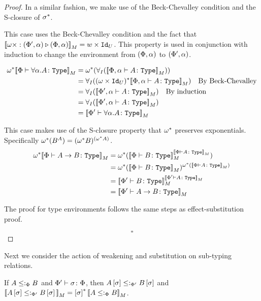 \documentclass{Report}
\begin{document}
\begin{proof}
   In a similar fashion, we make use of the Beck-Chevalley condition and the S-closure of $\sigma^*$.

        This case uses the Beck-Chevalley condition and the fact that ${\bf [\![}\omega\times : (\Phi', \alpha) \triangleright (\Phi,\alpha){\bf ]\!]}_M = w\times \texttt{Id}_{U}$. This property is used in conjunction with induction to change the environment from $(\Phi, \alpha)$ to $(\Phi', \alpha)$.

        \begin{align}
            \w\star\deno{\typerelation{\P}{\all{\a}A}{\type}} & = \w\star(\allI(\deno{\typerelation{\P,\a}{A}{\type}}))\\
            & = \allI((\w\times\Id{U})\star\deno{\typerelation{\P,\a}{A}{\type}})\qt{By Beck-Chevalley}\\
            & = \allI(\deno{\typerelation{\P',\a}{A}{\type}})\qt{By induction}\\
            & = \allI(\deno{\typerelation{\P',\a}{A}{\type}})\\
            & = \deno{\typerelation{\P'}{\all{\a}{A}}{\type}}\\
        \end{align}
    
    This case makes use of the S-closure property that $\omega^*$ preserves exponentials. Specifically $\omega^*(B^A) = (\omega^* B)^{(\omega^* A)}$.
    \begin{align}
        \w\star\deno{\typerelation{\P}{\ab}{\type}} &= \w\star(\deno{\typerelation{\P}{B}{\type}}^{\deno{\typerelation{\P}{A}{\type}}})\\
        &=\w\star(\deno{\typerelation{\P}{B}{\type}})^{\w\star(\deno{\typerelation{\P}{A}{\type}})}\\
        & = \deno{\typerelation{\P'}{B}{\type}}^{\deno{\typerelation{\P'}{A}{\type}}}\\
        & = \deno{\typerelation{\P'}{\ab}{\type}}\\
    \end{align}

    
    The proof for type environments follows the same steps as effect-substitution proof.

    $$\square$$
\end{proof}


Next we consider the action of weakening and substitution on sub-typing relations. 

\begin{theorem}
    If $A \leq:_\Phi B$ and $\Phi' \vdash \sigma \colon \Phi$, then $A\left[\sigma\right]\leq:_{\Phi'} B\left[\sigma\right]$ and ${\bf [\![}A\left[\sigma\right]\leq:_{\Phi'} B\left[\sigma\right]{\bf ]\!]}_M = \left[\sigma\right]^*{\bf [\![}A\leq:_\Phi B{\bf ]\!]}_M$.
\end{theorem}
\end{document}
